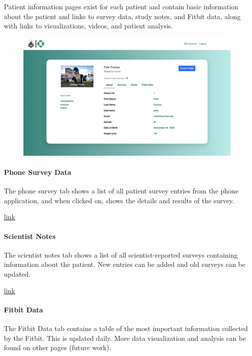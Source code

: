 \documentclass[]{book}
\let\oldparagraph\paragraph
\renewcommand{\paragraph}[1]{\oldparagraph{#1}\mbox{}}
\begin{document}
Patient information pages exist for each patient and contain basic
information about the patient and links to survey data, study notes, and
Fitbit data, along with links to visualizations, videos, and patient
analysis.

\begin{figure}
\centering
\includegraphics{images/Information_page.png}
\caption{}
\end{figure}

\paragraph{Phone Survey Data}\label{phone-survey-data}

The phone survey tab shows a list of all patient survey entries from the
phone application, and when clicked on, shows the details and results of
the survey.

\href{images/phone_survey_gif.gif}{link}

\paragraph{Scientist Notes}\label{scientist-notes}

The scientist notes tab shows a list of all scientist-reported surveys
containing information about the patient. New entries can be added and
old surveys can be updated.

\href{images/scientist_note_gif.gif}{link}

\paragraph{Fitbit Data}\label{fitbit-data}

The Fitbit Data tab contains a table of the most important information
collected by the Fitbit. This is updated daily. More data visualization
and analysis can be found on other pages (future work).
\end{document}
